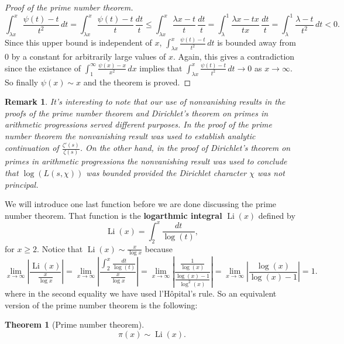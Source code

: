 \documentclass[12pt]{book}
\newtheorem{theorem}{Theorem}[section]
\newtheorem{remark}{Remark}[section]
\theoremstyle{definition}\newframedtheorem{method}{Method}
\newcommand{\z}{\zeta}
\renewcommand{\l}{\lambda}
\newcommand{\<}{\langle}
\renewcommand{\>}{\rangle}
\DeclareMathOperator{\Li}{\mathrm{Li}}
\begin{document}
\begin{proof}[Proof of the prime number theorem]
        \[
          \int_{\l x}^{x}\frac{\psi(t)-t}{t^{2}}\,dt = \int_{\l x}^{x}\frac{\psi(t)-t}{t}\,\frac{dt}{t} \le \int_{\l x}^{x}\frac{\l x-t}{t}\,\frac{dt}{t} = \int_{\l}^{1}\frac{\l x-tx}{tx}\,\frac{dt}{t} = \int_{\l}^{1}\frac{\l-t}{t^{2}}\,dt < 0.
        \]
        Since this upper bound is independent of $x$, $\int_{\l x}^{x}\frac{\psi(t)-t}{t^{2}}\,dt$ is bounded away from $0$ by a constant for arbitrarily large values of $x$. Again, this gives a contradiction since the existance of $\int_{1}^{\infty}\frac{\psi(x)-x}{x^{2}}\,dx$ implies that $\int_{\l x}^{x}\frac{\psi(t)-t}{t^{2}}\,dt \to 0$ as $x \to \infty$. So finally $\psi(x) \sim x$ and the theorem is proved.
      \end{proof}

      \begin{remark}
        It's interesting to note that our use of nonvanishing results in the proofs of the prime number theorem and Dirichlet's theorem on primes in arithmetic progressions served different purposes. In the proof of the prime number theorem the nonvanishing result was used to establish analytic continuation of $\frac{\z'(s)}{\z(s)}$. On the other hand, in the proof of Dirichlet's theorem on primes in arithmetic progressions the nonvanishing result was used to conclude that $\log(L(s,\chi))$ was bounded provided the Dirichlet character $\chi$ was not principal.
      \end{remark}

      We will introduce one last function before we are done discussing the prime number theorem. That function is the \textbf{logarthmic integral} $\Li(x)$ defined by
      \[
        \Li(x) = \int_{2}^{x}\frac{dt}{\log(t)},
      \]
      for $x \ge 2$. Notice that $\Li(x) \sim \frac{x}{\log{x}}$ because
      \[
        \lim_{x \to \infty}\left|\frac{\Li(x)}{\frac{x}{\log{x}}}\right| = \lim_{x \to \infty}\left|\frac{\int_{2}^{x}\frac{dt}{\log(t)}}{\frac{x}{\log{x}}}\right| = \lim_{x \to \infty}\left|\frac{\frac{1}{\log(x)}}{\frac{\log(x)-1}{\log^{2}(x)}}\right| = \lim_{x \to \infty}\left|\frac{\log(x)}{\log(x)-1}\right| = 1.
      \]
      where in the second equality we have used  l'H\^opital's rule. So an equivalent version of the prime number theorem is the following:

      \begin{theorem}[Prime number theorem]
        \phantom{ }
        \[
          \pi(x) \sim \Li(x).
        \]
      \end{theorem}
\end{document}
